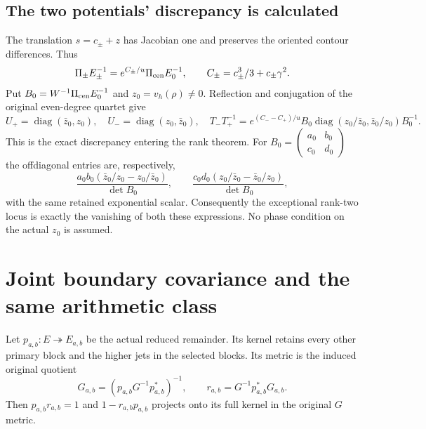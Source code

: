 \documentclass[11pt,a4paper]{article}
\newcommand{\diag}{\operatorname{diag}}
\begin{document}
\subsection{The two potentials' discrepancy is calculated}
The translation $s=c_\pm+z$ has Jacobian one and preserves the oriented contour differences. Thus
\begin{equation}
 \Pi_\pm E_\pm^{-1}=e^{C_\pm/u}\Pi_{\rm cen}E_0^{-1},\qquad
 C_\pm=c_\pm^3/3+c_\pm\gamma^2.
\end{equation}
Put $B_0=W^{-1}\Pi_{\rm cen}E_0^{-1}$ and $z_0=v_h(\rho)\ne0$. Reflection and conjugation of the original even-degree quartet give
\begin{equation}
 U_+=\diag(\bar z_0,z_0),\quad U_-=\diag(z_0,\bar z_0),\quad
 T_-T_+^{-1}=e^{(C_--C_+)/u}
 B_0\diag(z_0/\bar z_0,\bar z_0/z_0)B_0^{-1}.
\end{equation}
This is the exact discrepancy entering the rank theorem. For $B_0=\left(\begin{smallmatrix}a_0&b_0\\c_0&d_0\end{smallmatrix}\right)$ the offdiagonal entries are, respectively,
\begin{equation}
 \frac{a_0b_0(\bar z_0/z_0-z_0/\bar z_0)}{\det B_0},\qquad
 \frac{c_0d_0(z_0/\bar z_0-\bar z_0/z_0)}{\det B_0},
\end{equation}
with the same retained exponential scalar. Consequently the exceptional rank-two locus is exactly the vanishing of both these expressions. No phase condition on the actual $z_0$ is assumed.

\section{Joint boundary covariance and the same arithmetic class}
Let $p_{a,b}:E\twoheadrightarrow E_{a,b}$ be the actual reduced remainder. Its kernel retains every other primary block and the higher jets in the selected blocks. Its metric is the induced original quotient
\begin{equation}
 G_{a,b}=(p_{a,b}G^{-1}p_{a,b}^*)^{-1},\qquad
 r_{a,b}=G^{-1}p_{a,b}^*G_{a,b}.
\end{equation}
Then $p_{a,b}r_{a,b}=1$ and $1-r_{a,b}p_{a,b}$ projects onto its full kernel in the original $G$ metric.
\end{document}
